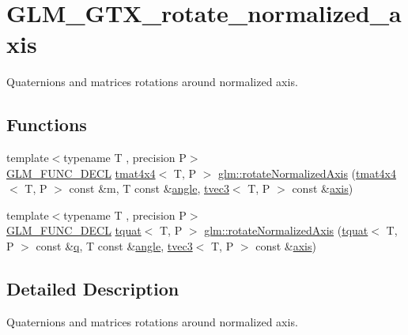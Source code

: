 \hypertarget{group__gtx__rotate__normalized__axis}{}\section{G\+L\+M\+\_\+\+G\+T\+X\+\_\+rotate\+\_\+normalized\+\_\+axis}
\label{group__gtx__rotate__normalized__axis}


Quaternions and matrices rotations around normalized axis.  


\subsection*{Functions}
\begin{DoxyCompactItemize}
\item 
{\footnotesize template$<$typename T , precision P$>$ }\\\mbox{\hyperlink{setup_8hpp_ab2d052de21a70539923e9bcbf6e83a51}{G\+L\+M\+\_\+\+F\+U\+N\+C\+\_\+\+D\+E\+CL}} \mbox{\hyperlink{structglm_1_1tmat4x4}{tmat4x4}}$<$ T, P $>$ \mbox{\hyperlink{group__gtx__rotate__normalized__axis_gaada623964a895def5a8b77b5b7887dc4}{glm\+::rotate\+Normalized\+Axis}} (\mbox{\hyperlink{structglm_1_1tmat4x4}{tmat4x4}}$<$ T, P $>$ const \&m, T const \&\mbox{\hyperlink{group__gtc__quaternion_gad4a4448baedb198b2b1e7880d2544dc9}{angle}}, \mbox{\hyperlink{structglm_1_1tvec3}{tvec3}}$<$ T, P $>$ const \&\mbox{\hyperlink{group__gtc__quaternion_ga0b3e87a13b2708154b72259e50789a19}{axis}})
\item 
{\footnotesize template$<$typename T , precision P$>$ }\\\mbox{\hyperlink{setup_8hpp_ab2d052de21a70539923e9bcbf6e83a51}{G\+L\+M\+\_\+\+F\+U\+N\+C\+\_\+\+D\+E\+CL}} \mbox{\hyperlink{structglm_1_1tquat}{tquat}}$<$ T, P $>$ \mbox{\hyperlink{group__gtx__rotate__normalized__axis_ga6c00234d844faef36a6a94669fbd1639}{glm\+::rotate\+Normalized\+Axis}} (\mbox{\hyperlink{structglm_1_1tquat}{tquat}}$<$ T, P $>$ const \&\mbox{\hyperlink{glad_8h_a514729309336df22bcc8eda979d6ced4}{q}}, T const \&\mbox{\hyperlink{group__gtc__quaternion_gad4a4448baedb198b2b1e7880d2544dc9}{angle}}, \mbox{\hyperlink{structglm_1_1tvec3}{tvec3}}$<$ T, P $>$ const \&\mbox{\hyperlink{group__gtc__quaternion_ga0b3e87a13b2708154b72259e50789a19}{axis}})
\end{DoxyCompactItemize}


\subsection{Detailed Description}
Quaternions and matrices rotations around normalized axis. 

